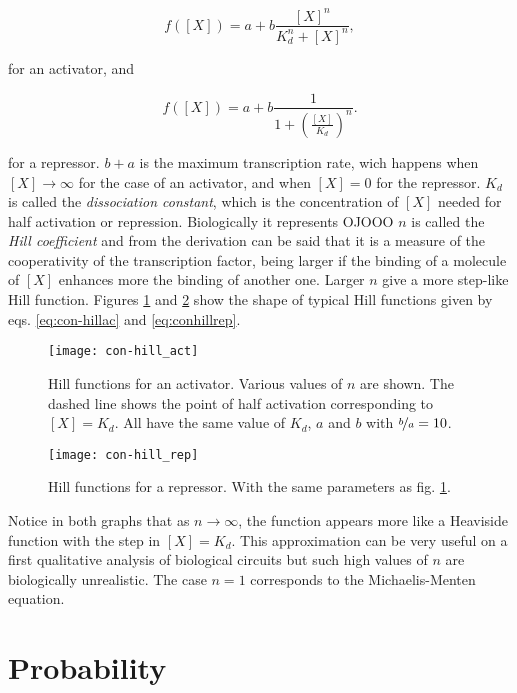 \begin{equation}
  \label{eq:con-hillac}
  f([X]) = a + b \frac{[X]^n}{K_d^n+[X]^n},
\end{equation}

for an activator, and

\begin{equation}
  \label{eq:con-hillrep}
  f([X]) = a + b \frac{1}{1+\left(\frac{[X]}{K_d}\right)^n}.
\end{equation}

for a repressor. $b+a$ is the maximum transcription rate, wich happens when $[X]\rightarrow\infty$ for the case of an activator, and when $[X]=0$ for the repressor. $K_d$ is called the \textit{dissociation constant}, which is the concentration of $[X]$ needed for half activation or repression. Biologically it represents OJOOO  $n$ is called the \textit{Hill coefficient} and from the derivation can be said that it is a measure of the cooperativity of the transcription factor, being larger if the binding of a molecule of $[X]$ enhances more the binding of another one. Larger $n$ give a more step-like Hill function. Figures \ref{fig:con-hill_act} and \ref{fig:con-hill_rep} show the shape of typical Hill functions given by eqs. \eqref{eq:con-hillac} and \eqref{eq:conhillrep}.

\begin{figure}[H]
  \centering
  \texttt{[image: con-hill\_act]}
  \caption[Hill function for an activator]{\label{fig:con-hill_act} Hill functions for an activator. Various values of $n$ are shown. The dashed line shows the point of half activation corresponding to $[X]=K_d$. All have the same value of $K_d$, $a$ and $b$ with $\nicefrac{b}{a}=10$.}
\end{figure}

\begin{figure}[H]
  \centering
  \texttt{[image: con-hill\_rep]}
  \caption[Hill function for a repressor]{\label{fig:con-hill_rep} Hill functions for a repressor. With the same parameters as fig. \ref{fig:con-hill_act}.}
\end{figure}

Notice in both graphs that as $n\rightarrow\infty$, the function appears more like a Heaviside function with the step in $[X] = K_d$. This approximation can be very useful on a first qualitative analysis of biological circuits but such high values of $n$ are biologically unrealistic. The case $n=1$ corresponds to the Michaelis-Menten equation.

\section{Probability}

